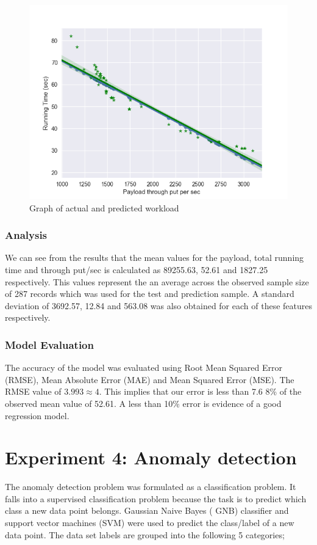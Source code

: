 \documentclass[12pt, letterpaper, titlepage]{report}
\begin{document}
\begin{figure}[h]
	\centering
	\includegraphics{workloadActualAndPredicted.png}
	\caption{Graph of actual and predicted workload}
	\label{fig_workloadPred200}
\end{figure}


\subsubsection{Analysis}
We can see from the results that the mean values for the payload, total running time and through put/sec is calculated as 89255.63, 52.61 and 1827.25 respectively. This values represent the an average across the observed sample size of 287 records which was used for the test and prediction sample. A standard deviation of 3692.57, 12.84 and 563.08 was also obtained for each of these features respectively.


\subsubsection{Model Evaluation}
The accuracy of the model was evaluated using Root Mean Squared Error (RMSE), Mean Absolute Error (MAE) and Mean Squared Error (MSE). The RMSE value of $3.993 \approx 4$. This implies that our error is less than 7.6 8\% of the observed mean value of 52.61. A less than 10\% error is evidence of a good regression model.


\section{Experiment 4: Anomaly detection}
The anomaly detection problem was formulated as a classification problem. It falls into a supervised classification problem because the task is to predict which class a new data point belongs. Gaussian Naive Bayes ( GNB) classifier and support vector machines (SVM) were used to predict the class/label of a new data point. The data set labels are grouped into the following 5 categories; 
\end{document}
